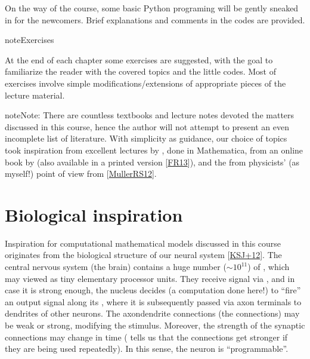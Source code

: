 \documentclass[letterpaper,10pt,english]{jupyterBook}
\begin{document}
\sphinxAtStartPar
On the way of the course, some basic Python programing will be gently sneaked in for the newcomers. Brief explanations and comments in the codes are provided.

\begin{sphinxadmonition}{note}{Exercises}

\sphinxAtStartPar
At the end of each chapter some exercises are suggested, with the goal to familiarize the reader with the covered topics and the little codes. Most of exercises involve simple modifications/extensions of appropriate pieces of the lecture material.
\end{sphinxadmonition}

\begin{sphinxadmonition}{note}{Note:}
\sphinxAtStartPar
There are countless textbooks and lecture notes devoted the matters discussed in this course, hence the author will not attempt to present an even incomplete list of literature. With simplicity as guidance, our choice of topics took inspiration from excellent lectures by , done in Mathematica, from an on\sphinxhyphen{}line book by  (also available in a printed version {[}\hyperlink{cite.docs/conclusion:id8}{FR13}{]}), and the from physicists’ (as myself!) point of view from {[}\hyperlink{cite.docs/conclusion:id7}{MullerRS12}{]}.
\end{sphinxadmonition}


\section{Biological inspiration}
\label{\detokenize{docs/intro:biological-inspiration}}
\sphinxAtStartPar
Inspiration for computational mathematical models discussed in this course originates from the biological structure of our neural system {[}\hyperlink{cite.docs/conclusion:id6}{KSJ+12}{]}. The central nervous system (the brain) contains a huge number (\(\sim 10^{11}\)) of , which may viewed as tiny elementary processor units. They receive signal via , and in case it is strong enough, the nucleus decides (a computation done here!) to “fire” an output signal along its , where it is subsequently passed via axon terminals to dendrites of other neurons. The axon\sphinxhyphen{}dendrite connections (the  connections) may be weak or strong, modifying the stimulus. Moreover, the strength of the synaptic connections may change in time ( tells us that the connections get stronger if they are being used repeatedly). In this sense, the neuron is “programmable”.
\end{document}
